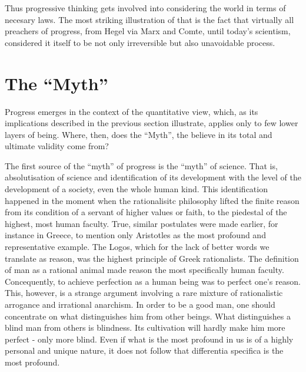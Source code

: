 Thus progressive thinking gets involved into considering the world in terms
of necesary laws. The most striking illustration of that is the fact that
virtually all preachers of progress, from Hegel via Marx and Comte, until 
today's scientism, considered it itself to be not only irreversible but also 
unavoidable process.

\section{The ``Myth''}
Progress emerges in the context of the quantitative view,  which, 
as its implications described in the previous section illustrate, applies only
to few lower layers of being. Where, then, does the ``Myth'', the believe in
its total and ultimate validity come from?

The first source of the ``myth'' of progress is the ``myth'' of science. That
is, absolutisation of science and identification of its development with the 
level of the development of a society, even the whole human kind. This
identification happened in the moment when the rationalisitc philosophy lifted
the finite reason from its condition of a servant of higher values or faith,
to the piedestal of the highest, most human faculty. True, similar postulates
were made earlier, for instance in Greece, to mention only Aristotles as the 
most profound and representative example. The Logos, which for the lack of 
better words we translate as reason, was the highest principle of Greek 
rationalists. The definition of man as a rational animal
made reason the most specifically human faculty. Concequently, to achieve 
perfection as a human being was to perfect one's reason. This, however, is a
strange argument involving a rare mixture of rationalistic arrogance and
irrational anarchism. In order to be a good man, one should concentrate on
what distinguishes him from other beings. What distinguishes a blind man from
others is blindness. Its cultivation will hardly make him more perfect - only
more blind. Even if what is the most profound in us is of a highly personal
and unique nature, it does not follow that differentia specifica is the most
profound.

